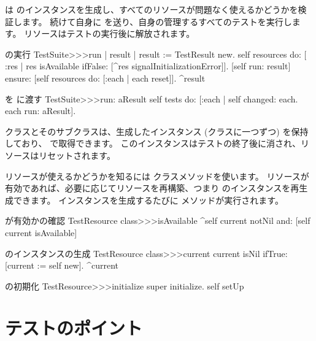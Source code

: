 \documentclass[a4paper,10pt,twoside]{book}
\begin{document}
 は  のインスタンスを生成し、すべてのリソースが問題なく使えるかどうかを検証します。
続けて自身に  を送り、自身の管理するすべてのテストを実行します。
リソースはテストの実行後に解放されます。

\begin{method}[testsuiterun]{ の実行}
TestSuite>>>run
	| result |
 	result := TestResult new.
	self resources do: [ :res |
		res isAvailable ifFalse: [^res signalInitializationError]].
	[self run: result] ensure: [self resources do: [:each | each reset]].
	^result
\end{method}

\begin{method}[testsuiterun:]{ を  に渡す}
TestSuite>>>run: aResult
	self tests do: [:each | 
		self changed: each.
		each run: aResult].
\end{method}

 クラスとそのサブクラスは、生成したインスタンス (クラスに一つずつ) を保持しており、  で取得できます。
このインスタンスはテストの終了後に消され、リソースはリセットされます。

リソースが使えるかどうかを知るには  クラスメソッドを使います。
リソースが有効であれば、必要に応じてリソースを再構築、つまり  のインスタンスを再生成できます。
インスタンスを生成するたびに  メソッドが実行されます。

\begin{method}[testresourceisavailable]{ が有効かの確認}
TestResource class>>>isAvailable
	^self current notNil and: [self current isAvailable]
\end{method}

\begin{method}[testresourcecurrent]{ のインスタンスの生成}
TestResource class>>>current
	current isNil ifTrue: [current := self new].
	^current
\end{method}

\begin{method}[restresourceinitialize]{ の初期化}
TestResource>>>initialize
	super initialize.
	self setUp
\end{method}

\section{テストのポイント}
\end{document}
